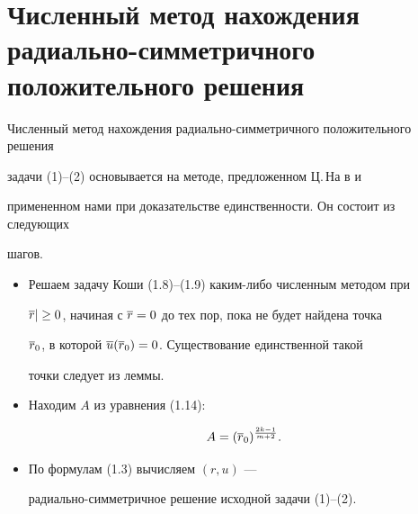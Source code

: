 \section{Численный метод нахождения радиально-симметричного\protect\\


положительного решения} 


 


Численный метод нахождения радиально-симметричного положительного решения 


задачи (1)--(2) основывается на методе, предложенном Ц.\,На в \cite{Na} и 


примененном нами при доказательстве единственности. Он состоит из следующих 


шагов. 


\begin{itemize} 


\item[1.] Решаем задачу Коши (1.8)--(1.9) каким-либо численным методом при 


$\overline r|\ge 0$, начиная с $\overline r=0$ до тех пор, пока не будет найдена точка 


$\overline r_0$, в которой $\overline u(\overline r_0)=0$. Существование единственной такой 


точки следует из леммы. 


\item[2.] Находим $A$ из уравнения (1.14): 


$$ 


A=(\ovl r_0)^{\frac{2k-1}{m+2}}. 


$$ 


\item[3.] По формулам (1.3) вычисляем $(r,u)$ --- 


радиально-симметричное решение исходной задачи (1)--(2). 


\end{itemize} 


 


